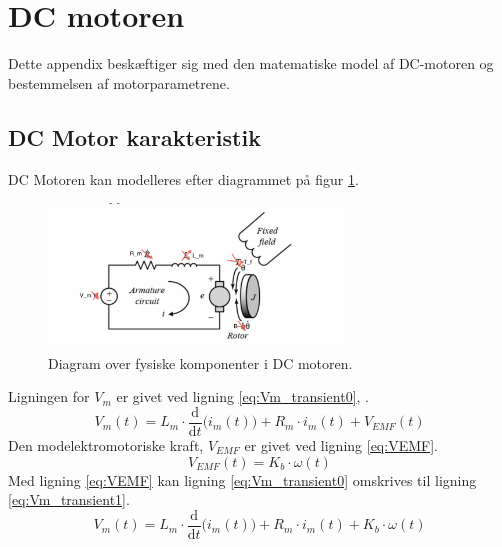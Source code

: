 \section{DC motoren}
\label{sec:dcmotor}
Dette appendix beskæftiger sig med den matematiske model af DC-motoren og bestemmelsen af motorparametrene.
\subsection{DC Motor karakteristik}
DC Motoren kan modelleres efter diagrammet på figur \ref{fig:DCmotor}. 

\begin{figure}[!th]
\centering
\includegraphics[width=0.7\textwidth]{./graphics/Mangleratblivetegnet}
%
\caption[DC motor]{Diagram over fysiske komponenter i DC motoren.}
\label{fig:DCmotor}
\end{figure}
Ligningen for \(V_m\) er givet ved ligning \ref{eq:Vm_transient0}, \citep{DCmotormodel}.
\begin{equation}
	V_m\left(t\right)=L_m \cdot \frac{\mathrm d}{\mathrm d t} \big( i_m\left(t\right) \big)+R_m \cdot i_m\left(t\right) + V_{EMF}\left(t\right)
	\label{eq:Vm_transient0} 
 \end{equation}
Den modelektromotoriske kraft, \(V_{EMF}\) er givet ved ligning \ref{eq:VEMF}.
\begin{equation}
	V_{EMF}\left(t\right) = K_b \cdot \omega\left(t\right)
	\label{eq:VEMF}
\end{equation}
Med ligning \ref{eq:VEMF} kan ligning \ref{eq:Vm_transient0} omskrives til ligning \ref{eq:Vm_transient1}.
\begin{equation}
	V_m\left(t\right)=L_m \cdot \frac{\mathrm d}{\mathrm d t} \big( i_m\left(t\right) \big)+R_m \cdot i_m\left(t\right) +K_b \cdot \omega\left(t\right)
	\label{eq:Vm_transient1} 
 \end{equation}

